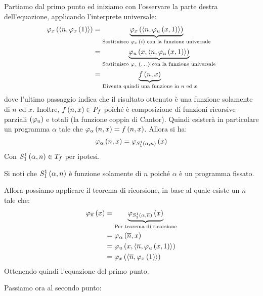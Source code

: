 \documentclass{lectures}
\begin{document}
\begin{solution}
    \begin{multicols}{2}
        Partiamo dal primo punto ed iniziamo con l'osservare la parte destra dell'equazione, applicando l'interprete universale:
        \begin{align*}
            \varphi_x\left(\left\langle n, \varphi_x\left(1\right)\right\rangle\right) &= \underbrace{\varphi_x\left(\left\langle n, \varphi_u\left(x,1\right)\right\rangle\right)}_{\text{Sostituisco \(\varphi_x\left(i\right)\) con la funzione universale}}\\
            &= \underbrace{\varphi_u\left(x, \left\langle n, \varphi_u\left(x,1\right)\right\rangle\right)}_{\text{Sostituisco \(\varphi_x\left(\ldots\right)\) con la funzione universale}}\\
            &= \underbrace{f\left(n,x\right)}_{\text{Diventa quindi una funzione in \(n\) ed \(x\)}}
        \end{align*}
        dove l'ultimo passaggio indica che il risultato ottenuto è una funzione solamente di \(n\) ed \(x\). Inoltre, \(f\left(n,x\right) \in P_f\) poiché è composizione di funzioni ricorsive parziali \(\left(\varphi_u\right)\) e totali (la funzione coppia di Cantor). Quindi esisterà in particolare un programma \(\alpha\) tale che \(\varphi_\alpha\left(n,x\right) = f\left(n,x\right)\). Allora si ha:
        \[
            \varphi_\alpha\left(n,x\right) = \varphi_{S^1_1\left(\alpha,n\right)}\left(x\right)
        \]
        Con \(S^1_1\left(\alpha, n\right) \in T_f\) per ipotesi.
        
        Si noti che \(S^1_1\left(\alpha, n\right)\) è funzione solamente di \(n\) poiché \(\alpha\) è un programma fissato.
        
        Allora possiamo applicare il teorema di ricorsione, in base al quale esiste un \(\bar{n}\) tale che:
        \begin{align*}
            \varphi_{\overline{n}}\left(x\right) &= \underbrace{\varphi_{S^1_1\left(\alpha, \overline{n}\right)}\left(x\right)}_{\text{Per teorema di ricorsione}}\\
            &= \varphi_\alpha\left(\overline{n}, x\right)\\
            &= \varphi_u\left(x, \left\langle\overline{n}, \varphi_u\left(x,1\right)\right\rangle\right)\\
            &= \varphi_x\left(\left\langle\overline{n}, \varphi_x\left(1\right)\right\rangle\right)
        \end{align*}
        Ottenendo quindi l'equazione del primo punto.
        \columnbreak
        
        Passiamo ora al secondo punto:
        

\end{multicols}
\end{solution}
\end{document}
